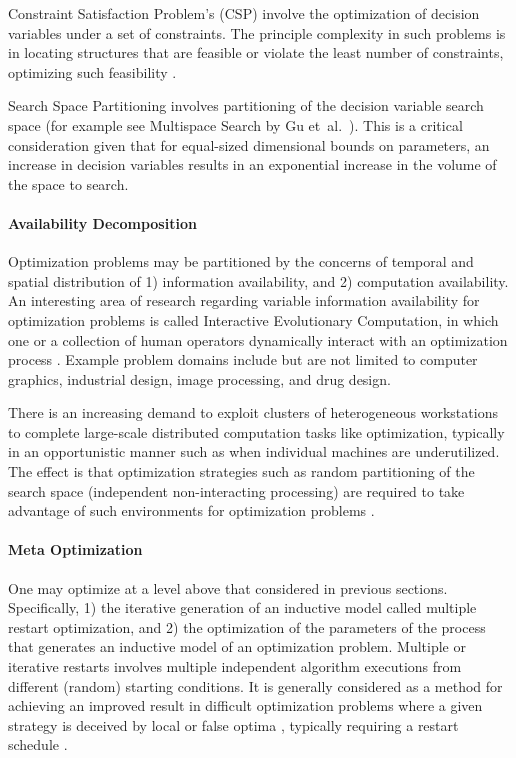 Constraint Satisfaction Problem's (CSP) involve the optimization of decision variables under a set of constraints. The principle complexity in such problems is in locating structures that are feasible or violate the least number of constraints, optimizing such feasibility \cite{Tsang1993, Kumar1992}. 

Search Space Partitioning involves partitioning of the decision variable search space (for example see Multispace Search by Gu et~al.\ \cite{Du1997, Gu1997, Gu1994}). This is a critical consideration given that for equal-sized dimensional bounds on parameters, an increase in decision variables results in an exponential increase in the volume of the space to search.
			
\paragraph{Availability Decomposition}
Optimization problems may be partitioned by the concerns of temporal and spatial distribution of 1) information availability, and 2) computation availability. An interesting area of research regarding variable information availability for optimization problems is called Interactive Evolutionary Computation, in which one or a collection of human operators dynamically interact with an optimization process \cite{Takagi2001}. Example problem domains include but are not limited to computer graphics, industrial design, image processing, and drug design. 

There is an increasing demand to exploit clusters of heterogeneous workstations to complete large-scale distributed computation tasks like optimization, typically in an opportunistic manner such as when individual machines are underutilized. The effect is that optimization strategies such as random partitioning of the search space (independent non-interacting processing) are required to take advantage of such environments for optimization problems \cite{Schnekenburger1993, Liu2000}.
	
\paragraph{Meta Optimization}
One may optimize at a level above that considered in previous sections. Specifically, 1) the iterative generation of an inductive model called multiple restart optimization, and 2) the optimization of the parameters of the process that generates an inductive model of an optimization problem. Multiple or iterative restarts involves multiple independent algorithm executions from different (random) starting conditions. It is generally considered as a method for achieving an improved result in difficult optimization problems where a given strategy is deceived by local or false optima \cite{Muselli1997, Hu1994}, typically requiring a restart schedule \cite{Fukunaga1998}. 

